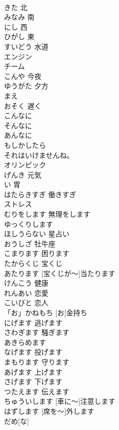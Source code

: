 \documentclass[8pt]{extreport}
\begin{document}
\begin{CJK}{UTF8}{min}
\\	きた	北	
\\	みなみ	南	
\\	にし	西	
\\	ひがし	東	
\\	すいどう	水道	
\\	エンジン			
\\	チーム			
\\	こんや	今夜	
\\	ゆうがた	夕方	
\\	まえ			
\\	おそく	遅く	
\\	こんなに			
\\	そんなに			
\\	あんなに			
\\	もしかしたら			
\\	それはいけませんね。			
\\	オリンピック			
\\	げんき	元気	
\\	い	胃	
\\	はたらきすぎ	働きすぎ	
\\	ストレス			
\\	むりをします	無理をします	
\\	ゆっくりします			
\\	ほしうらない	星占い	
\\	おうしざ	牡牛座	
\\	こまります	困ります	
\\	たからくじ	宝くじ	
\\	あたります	[宝くじが～]当たります	
\\	けんこう	健康	
\\	れんあい	恋愛	
\\	こいびと	恋人	
\\	「お」かねもち	[お]金持ち	
\\	にげます	逃げます	
\\	さわぎます	騒ぎます	
\\	あきらめます			
\\	なげます	投げます	
\\	まもります	守ります	
\\	あげます	上げます	
\\	さげます	下げます	
\\	つたえます	伝えます	
\\	[くるまに～]ちゅういします	[車に～]注意します	
\\	[せきを～] はずします	[席を～]外します	
\\	だめ[な]			

\end{CJK}
\end{document}
